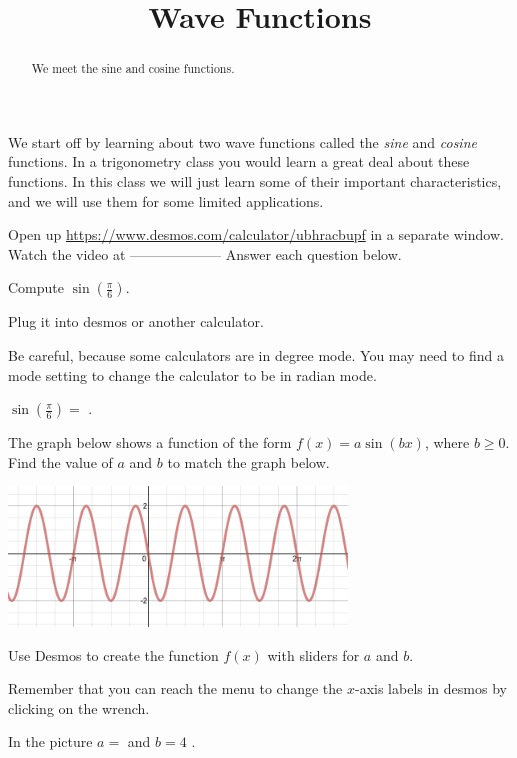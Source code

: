 \documentclass{ximera}
\title{Wave Functions}
\begin{document}
\begin{abstract}
We meet the sine and cosine functions.
\end{abstract}
\maketitle


We start off by learning about two wave functions called the \emph{sine} and \emph{cosine} functions. In a trigonometry class you would learn a great deal about these functions. In this class we will just learn some of their important characteristics, and we will use them for some limited applications.

Open up \url{https://www.desmos.com/calculator/ubhracbupf} in a separate window. Watch the video at  -------------------- Answer each question below.

\begin{exercise}
Compute $\sin\left(\frac{\pi}{6}\right)$.
\begin{solution} 
\begin{hint}
Plug it into desmos or another calculator. 
\end{hint}
\begin{hint}
Be careful, because some calculators are in degree mode. You may need to find a mode setting to change the calculator to be in radian mode.
\end{hint}
$\sin\left(\frac{\pi}{6}\right)=$ .
\end{solution}
\end{exercise}

\begin{question}
The graph below shows a function of the form $f(x)=a\sin(bx)$, where $b\ge0$. Find the value of $a$ and $b$ to match the graph below.
\begin{image}
\includegraphics[width=9cm]{mysterysine.png}
\end{image}
\begin{solution}
\begin{hint}
Use Desmos to create the function $f(x)$ with sliders for $a$ and $b$. 
\end{hint}
\begin{hint}
Remember that you can reach the menu to change the $x$-axis labels in desmos by clicking on the wrench.
\end{hint}
In the picture $a=$  and $b=4$ .
\end{solution}
\end{question}
\end{document}

